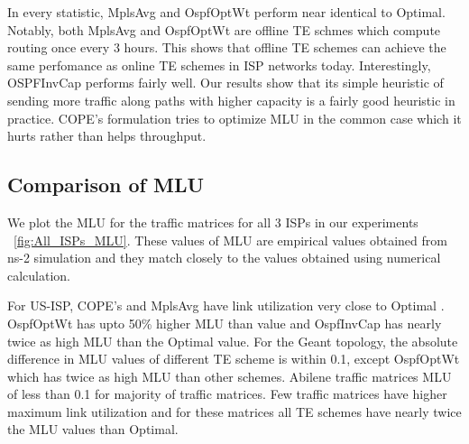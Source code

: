 %

In every statistic, MplsAvg and OspfOptWt perform near identical to Optimal. Notably, both MplsAvg and OspfOptWt are offline TE schmes which compute routing once every 3 hours. This shows that offline TE schemes can achieve the same perfomance as online TE schemes in ISP networks today. Interestingly, OSPFInvCap performs fairly well. Our results show that its simple heuristic of sending more traffic along paths with higher capacity is a fairly good heuristic in practice. COPE's formulation tries to optimize MLU in the common case which it hurts rather than helps throughput.

\subsection{Comparison of MLU}

 We plot the MLU for the traffic matrices for all 3 ISPs  in our experiments ~\ref{fig:All_ISPs_MLU}. These values of MLU are empirical values obtained from ns-2 simulation and they match closely to the values obtained using numerical calculation. 

 For US-ISP, COPE's and MplsAvg have link utilization very close to Optimal . OspfOptWt has upto 50\% higher MLU than value and OspfInvCap has nearly twice as high MLU than the Optimal value. For the Geant topology, the absolute difference in MLU values of different TE scheme is within 0.1, except OspfOptWt which has twice as high MLU than other schemes. Abilene traffic matrices MLU of less than 0.1 for majority of traffic matrices. Few traffic matrices have higher maximum link utilization and for these matrices all TE schemes have nearly twice the MLU values than Optimal.

